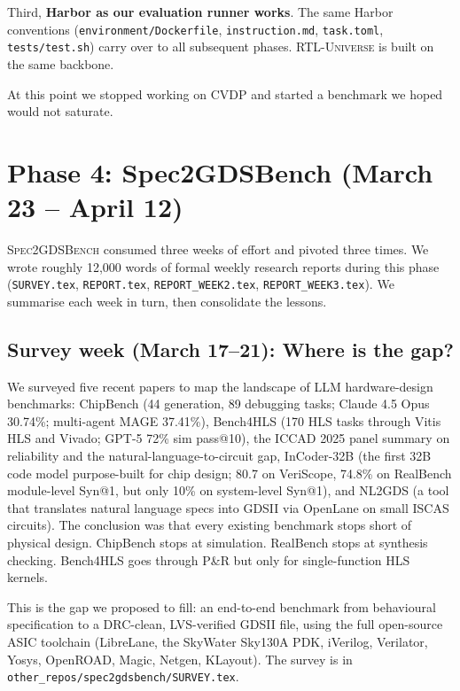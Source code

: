\documentclass{article}
\begin{document}
Third, \textbf{Harbor as our evaluation runner works}. The same Harbor conventions
(\texttt{environment/Dockerfile}, \texttt{instruction.md}, \texttt{task.toml},
\texttt{tests/test.sh}) carry over to all subsequent phases. \textsc{RTL-Universe} is built
on the same backbone.

At this point we stopped working on CVDP and started a benchmark we hoped would not
saturate.

\section{Phase 4: Spec2GDSBench (March 23 -- April 12)}
\label{sec:spec2gds}

\textsc{Spec2GDSBench} consumed three weeks of effort and pivoted three times. We wrote
roughly 12{,}000 words of formal weekly research reports during this phase
(\texttt{SURVEY.tex}, \texttt{REPORT.tex}, \texttt{REPORT\_WEEK2.tex},
\texttt{REPORT\_WEEK3.tex}). We summarise each week in turn, then consolidate the lessons.

\subsection{Survey week (March 17--21): Where is the gap?}

We surveyed five recent papers to map the landscape of LLM hardware-design benchmarks:
ChipBench (44 generation, 89 debugging tasks; Claude 4.5 Opus 30.74\%; multi-agent MAGE
37.41\%), Bench4HLS (170 HLS tasks through Vitis HLS and Vivado; GPT-5 72\% sim
pass@10), the ICCAD 2025 panel summary on reliability and the natural-language-to-circuit
gap, InCoder-32B (the first 32B code model purpose-built for chip design; 80.7 on
VeriScope, 74.8\% on RealBench module-level Syn@1, but only 10\% on system-level Syn@1),
and NL2GDS (a tool that translates natural language specs into GDSII via OpenLane on
small ISCAS circuits). The conclusion was that every existing benchmark stops short of
physical design. ChipBench stops at simulation. RealBench stops at synthesis checking.
Bench4HLS goes through P\&R but only for single-function HLS kernels.

This is the gap we proposed to fill: an end-to-end benchmark from behavioural
specification to a DRC-clean, LVS-verified GDSII file, using the full open-source ASIC
toolchain (LibreLane, the SkyWater Sky130A PDK, iVerilog, Verilator, Yosys, OpenROAD,
Magic, Netgen, KLayout). The survey is in \texttt{other\_repos/spec2gdsbench/SURVEY.tex}.
\end{document}
